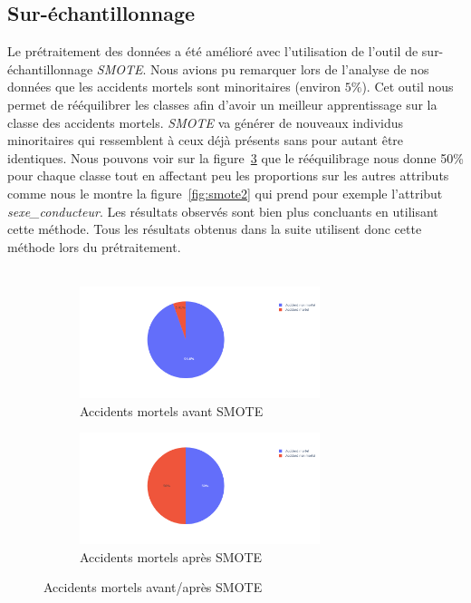 \documentclass{article}
\begin{document}
    \subsection{Sur-échantillonnage}
    Le prétraitement des données a été amélioré avec l'utilisation de l'outil de sur-échantillonnage \textit{SMOTE}.
    Nous avions pu remarquer lors de l'analyse de nos données que les accidents mortels sont minoritaires (environ $5\%$).
    Cet outil nous permet de rééquilibrer les classes afin d'avoir un meilleur apprentissage sur la classe des accidents 
    mortels. \textit{SMOTE} va générer de nouveaux individus minoritaires qui ressemblent à ceux déjà présents sans 
    pour autant être identiques.
    Nous pouvons voir sur la figure~\ref{fig:smote1} que le rééquilibrage nous donne 50\% pour chaque classe 
    tout en affectant peu les proportions sur les autres attributs comme nous le montre la figure~\ref{fig:smote2} 
    qui prend pour exemple l'attribut \textit{sexe\_conducteur}.
    Les résultats observés sont bien plus concluants en utilisant cette méthode.
    Tous les résultats obtenus dans la suite utilisent donc cette méthode lors du prétraitement.
    \\\\
    \begin{figure}[!h]
        \vspace{2cm}
        \centering
        \begin{subfigure}{7cm}
            \includegraphics[width=7cm]{./img/smote/before.png}
            \caption{Accidents mortels avant SMOTE}\label{fig:before_smote}
        \end{subfigure}
        \hspace{0.2cm}
        \begin{subfigure}{7cm}
            \includegraphics[width=7cm]{./img/smote/after.png}
        \caption{Accidents mortels après SMOTE}\label{fig:after_smote}
        \end{subfigure}
        \caption{Accidents mortels avant/après SMOTE}\label{fig:smote1}
    \end{figure}
\end{document}
